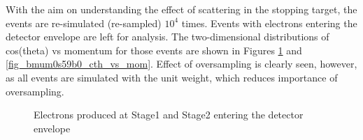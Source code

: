 \documentclass[12pt]{article}
\begin{document}
With the aim on understanding the effect of scattering in the stopping target,
the events are re-simulated (re-sampled) $10^4$ times.
Events with electrons entering the detector envelope are left for analysis.
%
The two-dimensional distributions of cos(theta) vs momentum for those events
are shown in Figures \ref{fig_bmum0s56b0_cth_vs_mom} and \ref{fig_bmum0s59b0_cth_vs_mom}.
Effect of oversampling is clearly seen, however, as all events are simulated with
the unit weight, which reduces importance of oversampling.

\begin{figure}[h]
  \hspace{-0.5in}
  \caption{
    \label{fig_bmum0s56b0_cth_vs_mom}
    Electrons produced at Stage1 and Stage2 entering the detector envelope
  }
\end{figure}
    
\end{document}
